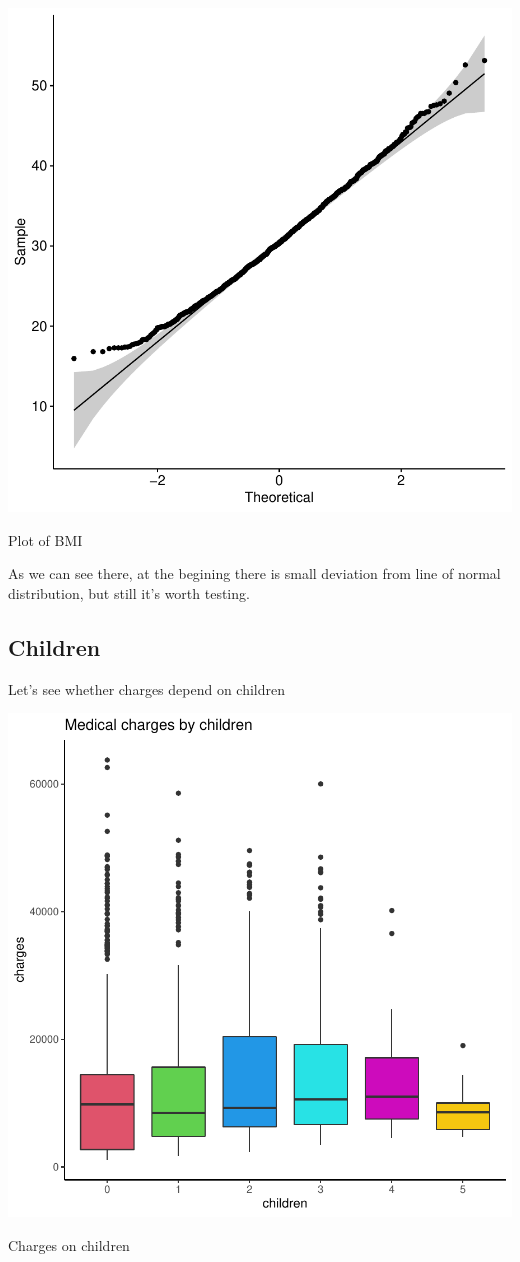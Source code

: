 \documentclass{article}
\begin{document}
\begin{centerfig}
\includegraphics{Untitled-024}
\caption{Plot of BMI}
\end{centerfig}

As we can see there, at the begining there is small deviation from line of normal distribution, but still it's worth testing.


\subsection{Children}
Let's see whether charges depend on children
\begin{centerfig}
\includegraphics{Untitled-025}
\caption{Charges on children}
\end{centerfig}
\end{document}
